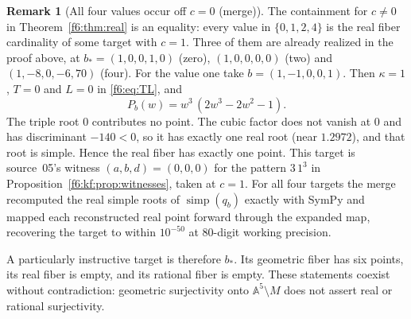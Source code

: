 \documentclass[11pt,a4paper]{article}
\theoremstyle{definition}
\newtheorem{remark}[theorem]{Remark}
\newcommand{\A}{\mathbb A}
\newcommand{\simp}{\operatorname{simp}}
\newcommand{\kk}{\kappa}
\begin{document}
\begin{remark}[All four values occur off $c=0$ (merge)]\label{f6:rem:realoffc0}
The containment for $c\ne0$ in Theorem~\ref{f6:thm:real} is an equality:
every value in $\{0,1,2,4\}$ is the real fiber cardinality of some target
with $c=1$. Three of them are already realized in the proof above, at
$b_*=(1,0,0,1,0)$ (zero), $(1,0,0,0,0)$ (two) and $(1,-8,0,-6,70)$ (four).
For the value one take $b=(1,-1,0,0,1)$. Then $\kk=1$, $T=0$ and $L=0$ in
\eqref{f6:eq:TL}, and
\[
 P_b(w)=w^3\,(2w^3-2w^2-1).
\]
The triple root $0$ contributes no point. The cubic factor does not vanish
at $0$ and has discriminant $-140<0$, so it has exactly one real root
(near $1.2972$), and that root is simple. Hence the real fiber has exactly
one point. This target is source~05's witness $(a,b,d)=(0,0,0)$ for the
pattern $3\,1^3$ in Proposition~\ref{f6:kf:prop:witnesses}, taken at $c=1$.
For all four targets the merge recomputed the real simple roots of
$\simp(q_b)$ exactly with SymPy and mapped each reconstructed real point
forward through the expanded map, recovering the target to within
$10^{-50}$ at $80$-digit working precision.
\end{remark}

A particularly instructive target is therefore $b_*$. Its geometric
fiber has six points, its real fiber is empty, and its rational fiber is
empty. These statements coexist without contradiction: geometric
surjectivity onto $\A^5\setminus M$ does not assert real or rational
surjectivity.

\end{document}
